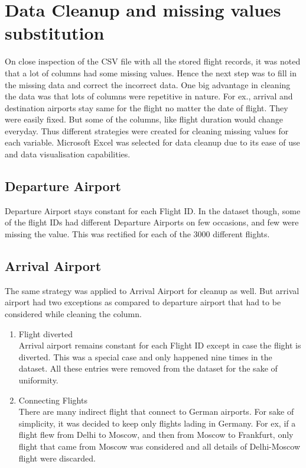 \section{Data Cleanup and missing values substitution}
On close inspection of the CSV file with all the stored flight records, it was noted that a lot of columns had some missing values. Hence the next step was to fill in the missing data and correct the incorrect data. One big advantage in cleaning the data was that lots of columns were repetitive in nature. For ex., arrival and destination airports stay same for the flight no matter the date of flight. They were easily fixed. But some of the columns, like flight duration would change everyday. Thus different strategies were created for cleaning missing values for each variable. Microsoft Excel was selected for data cleanup due to its ease of use and data visualisation capabilities.

\subsection{Departure Airport}
Departure Airport stays constant for each Flight ID. In the dataset though, some of the flight IDs had different Departure Airports on few occasions, and few were missing the value. This was rectified for each of the 3000 different flights.

\subsection{Arrival Airport}
The same strategy was applied to Arrival Airport for cleanup as well. But arrival airport had two exceptions as compared to departure airport that had to be considered while cleaning the column.
\begin{enumerate}
    \item Flight diverted
    \\Arrival airport remains constant for each Flight ID except in case the flight is diverted. This was a special case and only happened nine times in the dataset. All these entries were removed from the dataset for the sake of uniformity.
    \item Connecting Flights
    \\There are many indirect flight that connect to German airports. For sake of simplicity, it was decided to keep only flights lading in Germany. For ex, if a flight flew from Delhi to Moscow, and then from Moscow to Frankfurt, only flight that came from Moscow was considered and all details of Delhi-Moscow flight were discarded. 
\end{enumerate} 

